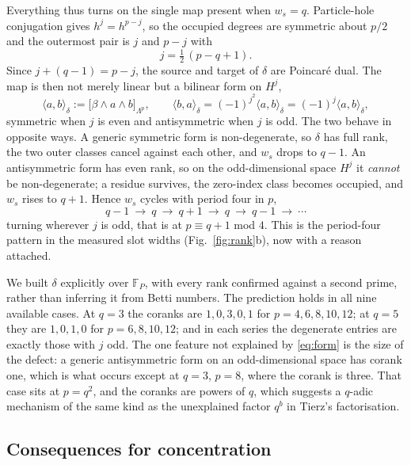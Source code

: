 \documentclass[10pt]{article}
\begin{document}
Everything thus turns on the single map present when $w_s=q$. Particle-hole conjugation gives $h^j=h^{p-j}$, so
the occupied degrees are symmetric about $p/2$ and the outermost pair is $j$ and $p-j$ with
\begin{equation}
j=\tfrac12\,(p-q+1).
\end{equation}
Since $j+(q-1)=p-j$, the source and target of $\delta$ are Poincar\'e dual. The map is then not merely linear
but a bilinear form on $H^j$,
\begin{equation}
\langle a,b\rangle_\delta:=\big[\beta\wedge a\wedge b\big]_{\Lambda^p},
\qquad \langle b,a\rangle_\delta=(-1)^{j^2}\langle a,b\rangle_\delta=(-1)^{j}\langle a,b\rangle_\delta ,
\label{eq:form}
\end{equation}
symmetric when $j$ is even and antisymmetric when $j$ is odd. The two behave in opposite ways. A generic
symmetric form is non-degenerate, so $\delta$ has full rank, the two outer classes cancel against each other,
and $w_s$ drops to $q-1$. An antisymmetric form has even rank, so on the odd-dimensional space $H^j$ it
\emph{cannot} be non-degenerate; a residue survives, the zero-index class becomes occupied, and $w_s$ rises to
$q+1$. Hence $w_s$ cycles with period four in $p$,
\begin{equation}
q-1\ \longrightarrow\ q\ \longrightarrow\ q+1\ \longrightarrow\ q\ \longrightarrow\ q-1\ \longrightarrow\ \cdots
\label{eq:cycle}
\end{equation}
turning wherever $j$ is odd, that is at $p\equiv q+1$ mod $4$. This is the period-four pattern in the measured
slot widths (Fig.~\ref{fig:rank}b), now with a reason attached.

We built $\delta$ explicitly over $\mathbb F_P$, with every rank confirmed against a second prime, rather than
inferring it from Betti numbers. The prediction holds in all nine available cases. At $q=3$ the coranks are
$1,0,3,0,1$ for $p=4,6,8,10,12$; at $q=5$ they are $1,0,1,0$ for $p=6,8,10,12$; and in each series the
degenerate entries are exactly those with $j$ odd. The one feature not explained by \eqref{eq:form} is the size
of the defect: a generic antisymmetric form on an odd-dimensional space has corank one, which is what occurs
except at $q=3$, $p=8$, where the corank is three. That case sits at $p=q^2$, and the coranks are powers of $q$,
which suggests a $q$-adic mechanism of the same kind as the unexplained factor $q^{b}$ in Tierz's factorisation.

\subsection{Consequences for concentration}
\end{document}
